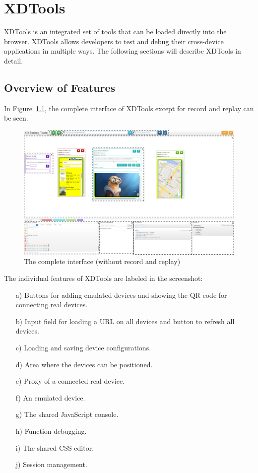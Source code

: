 \chapter{XDTools}

XDTools is an integrated set of tools that can be loaded directly into the browser. XDTools allows developers to test and debug their cross-device applications in multiple ways. The following sections will describe XDTools in detail.

\section{Overview of Features}

In Figure~\ref{fig:complete}, the complete interface of XDTools except for record and replay can be seen.

\begin{figure}[H]
  \centering
    \includegraphics[width=1.0\textwidth]{images/screenshots/complete_labeled.png}
	\caption[Screenshot: Complete Interface]{The complete interface (without record and replay)}
	\label{fig:complete}
\end{figure}

The individual features of XDTools are labeled in the screenshot:
\begin{itemize}
	\item [a)] Buttons for adding emulated devices and showing the QR code for connecting real devices.
	\item [b)] Input field for loading a URL on all devices and button to refresh all devices.
	\item [c)] Loading and saving device configurations.
	\item [d)] Area where the devices can be positioned.
	\item [e)] Proxy of a connected real device.
	\item [f)] An emulated device.
	\item [g)] The shared JavaScript console.
	\item [h)] Function debugging.
	\item [i)] The shared CSS editor.
	\item [j)] Session management.
\end{itemize}

